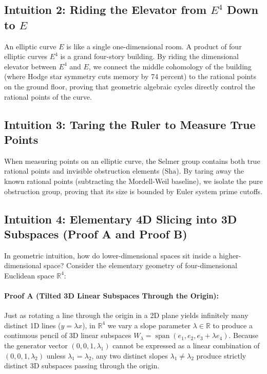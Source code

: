 \documentclass[11pt,a4paper]{article}
\theoremstyle{definition}
\def\Sha{\mathrm{Sha}}
\begin{document}
\subsection{Intuition 2: Riding the Elevator from $E^4$ Down to $E$}
An elliptic curve $E$ is like a single one-dimensional room. A product of four elliptic curves $E^4$ is a grand four-story building. By riding the dimensional elevator between $E^4$ and $E$, we connect the middle cohomology of the building (where Hodge star symmetry cuts memory by 74 percent) to the rational points on the ground floor, proving that geometric algebraic cycles directly control the rational points of the curve.

\subsection{Intuition 3: Taring the Ruler to Measure True Points}
When measuring points on an elliptic curve, the Selmer group contains both true rational points and invisible obstruction elements ($\Sha$). By taring away the known rational points (subtracting the Mordell-Weil baseline), we isolate the pure obstruction group, proving that its size is bounded by Euler system prime cutoffs.

\subsection{Intuition 4: Elementary 4D Slicing into 3D Subspaces (Proof A and Proof B)}
In geometric intuition, how do lower-dimensional spaces sit inside a higher-dimensional space?
Consider the elementary geometry of four-dimensional Euclidean space $\mathbb{R}^4$:

\paragraph{Proof A (Tilted 3D Linear Subspaces Through the Origin):}
Just as rotating a line through the origin in a 2D plane yields infinitely many distinct 1D lines ($y = \lambda x$), in $\mathbb{R}^4$ we vary a slope parameter $\lambda \in \mathbb{R}$ to produce a continuous pencil of 3D linear subspaces $W_\lambda = \operatorname{span}(e_1, e_2, e_3 + \lambda e_4)$. Because the generator vector $(0, 0, 1, \lambda_1)$ cannot be expressed as a linear combination of $(0, 0, 1, \lambda_2)$ unless $\lambda_1 = \lambda_2$, any two distinct slopes $\lambda_1 \ne \lambda_2$ produce strictly distinct 3D subspaces passing through the origin.
\end{document}
